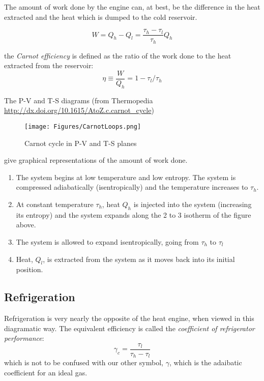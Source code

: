 The amount of work done by the engine can, at best, be the difference in the heat extracted and the heat which is dumped to the cold reservoir.

\begin{equation}
W = Q_h - Q_l = \frac{\tau_h - \tau_l}{\tau_h} Q_h
\end{equation}

the \textit{Carnot efficiency} is defined as the ratio of the work done to the heat extracted from the reservoir:
\begin{equation}
\eta \equiv \frac{W}{Q_h} = 1 - \tau_l/\tau_h
\end{equation}

The P-V and T-S diagrams (from Thermopedia \url{http://dx.doi.org/10.1615/AtoZ.c.carnot_cycle})
\begin{figure}[h]
\centering
\texttt{[image: Figures/CarnotLoops.png]}
\caption{Carnot cycle in P-V and T-S planes}
\end{figure}
give graphical representations of the amount of work done.

\begin{enumerate}
\item The system begins at low temperature and low entropy. The system 
	is compressed adiabatically (isentropically) and the temperature 
	increases to $\tau_h$.

\item At constant temperature $\tau_h$, heat $Q_h$ is injected into the 
	system (increasing its entropy) and the system expands along the 
	2 to 3 isotherm of the figure above.

\item The system is allowed to expand isentropically, going from $\tau_h$ to $\tau_l$

\item Heat, $Q_l$, is extracted from the system as it moves back 
	into its initial position.

\end{enumerate}


\subsection{Refrigeration}
Refrigeration is very nearly the opposite of the heat engine, when viewed in this diagramatic way. The equivalent efficiency is called the \emph{coefficient of refrigerator performance}:
\begin{equation}
\gamma_c = \frac{\tau_l}{\tau_h - \tau_l}
\end{equation}
which is not to be confused with our other symbol, $\gamma$, which is the adaibatic coefficient for an ideal gas.

